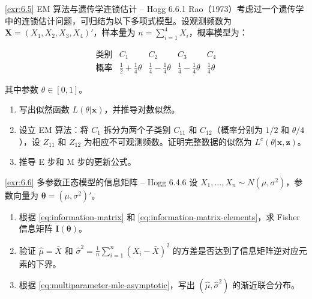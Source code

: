 \begin{exercise}{\ref{exr:6.5} EM 算法与遗传学连锁估计 – Hogg 6.6.1}\label{exr:6.5}
Rao（1973）考虑过一个遗传学中的连锁估计问题，可归结为以下多项式模型。设观测频数为 $\mathbf{X} = (X_1, X_2, X_3, X_4)'$，样本量为 $n = \sum_{i=1}^4 X_i$，概率模型为：

\[
\begin{array}{c|cccc}
\text{类别} & C_1 & C_2 & C_3 & C_4 \\ \hline
\text{概率} & \frac{1}{2} + \frac{1}{4}\theta & \frac{1}{4} - \frac{1}{4}\theta & \frac{1}{4} - \frac{1}{4}\theta & \frac{1}{4}\theta
\end{array}
\]

其中参数 $\theta \in [0,1]$。

\begin{enumerate}
\item 写出似然函数 $L(\theta | \mathbf{x})$，并推导对数似然。
\item 设立 EM 算法：将 $C_1$ 拆分为两个子类别 $C_{11}$ 和 $C_{12}$（概率分别为 $1/2$ 和 $\theta/4$），设 $Z_{11}$ 和 $Z_{12}$ 为相应不可观测频数。证明完整数据的似然为 $L^c(\theta | \mathbf{x}, \mathbf{z})$。
\item 推导 E 步和 M 步的更新公式。
\end{enumerate}

\end{exercise}

\begin{exercise}{\ref{exr:6.6} 多参数正态模型的信息矩阵 – Hogg 6.4.6}\label{exr:6.6}
设 $X_1, \ldots, X_n \sim N(\mu, \sigma^2)$，参数向量为 $\boldsymbol{\theta} = (\mu, \sigma^2)'$。

\begin{enumerate}
\item 根据 \eqref{eq:information-matrix} 和 \eqref{eq:information-matrix-elements}，求 Fisher 信息矩阵 $\mathbf{I}(\boldsymbol{\theta})$。
\item 验证 $\widehat{\mu} = \bar{X}$ 和 $\widehat{\sigma}^2 = \frac{1}{n}\sum_{i=1}^n (X_i - \bar{X})^2$ 的方差是否达到了信息矩阵逆对应元素的下界。
\item 根据 \eqref{eq:multiparameter-mle-asymptotic}，写出 $(\widehat{\mu}, \widehat{\sigma}^2)$ 的渐近联合分布。
\end{enumerate}

\end{exercise}

